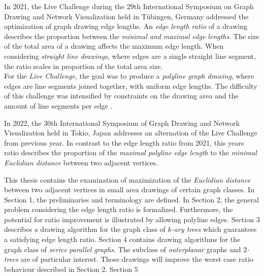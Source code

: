 \bigskip

In 2021, the Live Challenge during the 29th International Symposium on Graph Drawing and Network Visualization held in Tübingen, Germany addressed the optimization of graph drawing edge lengths. An \emph{edge length ratio} of a drawing describes the proportion between the \emph{minimal and maximal edge lengths}. The size of the total area of a drawing affects the maximum edge length. When considering \emph{straight line drawings}, where edges are a single straight line segment, the ratio scales in proportion of the total area size.\\
For the \emph{Live Challenge}, the goal was to produce a \emph{polyline graph drawing}, where edges are line segments joined together, with uniform edge lengths. 
The difficulty of this challenge was intensified by constraints on the drawing area and the amount of line segments per edge \cite{GD:2021_Challenge}.

\bigskip


In 2022, the 30th International Symposium of Graph Drawing and Network Visualization held in Tokio, Japan \cite{GD:2022_Challenge} addresses an alternation of the Live Challenge from previous year. In contrast to the edge length ratio from 2021, this years ratio describes the proportion of the \emph{maximal polyline edge length} to the \emph{minimal Euclidian distance} between two adjacent vertices. 

\bigskip


This thesis contains the examination of maximization of the \emph{Euclidian distance} between two adjacent vertices in small area drawings of certain graph classes.
In Section 1, the preliminaries and terminology are defined. 
In Section 2, the general problem considering the edge length ratio is formalized. Furthermore, the potential for ratio improvement is illustrated by allowing polyline edges. 
Section 3 describes a drawing algorithm for the graph class of \emph{$k$-ary trees} which guarantees a satisfying edge length ratio.
Section 4 contains drawing algorithms for the graph class of \emph{series parallel graphs}. The subclass of \emph{outerplanar} graphs and \emph{$2$-trees} are of particular interest. Those drawings will improve the worst case ratio behaviour described in Section 2.
Section 5 




